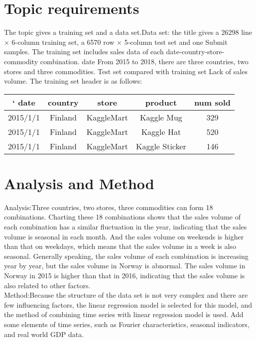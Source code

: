 \section{Topic requirements} \label{sec-preliminaries}

The topic gives a training set and a data set.Data set: the title gives a 26298 line × 6-column training set, a 6570 row × 5-column test set and one
Submit samples. The training set includes sales data of each date-country-store-commodity combination. date
From 2015 to 2018, there are three countries, two stores and three commodities. Test set compared with training set
Lack of sales volume. The training set header is as follows:
\\
\begin{tabular}{ c | c | c | c | c }
	\toprule`
	date    &  country    & store & product & num sold      \\
	\midrule
	2015/1/1 &  Finland   &  KaggleMart   & Kaggle Mug & 329   \\
	
	2015/1/1 &  Finland   &  KaggleMart   & Kaggle Hat & 520   \\
	
	2015/1/1 &  Finland   &  KaggleMart   & Kaggle Sticker & 146   \\
	\bottomrule
\end{tabular}




\section{Analysis and Method} \label{sec-method}

Analysis:Three countries, two stores, three commodities can form 18 combinations. Charting these 18 combinations shows that the sales volume of each combination has a similar fluctuation in the year, indicating that the sales volume is seasonal in each month. And the sales volume on weekends is higher than that on weekdays, which means that the sales volume in a week is also seasonal. Generally speaking, the sales volume of each combination is increasing year by year, but the sales volume in Norway is abnormal. The sales volume in Norway in 2015 is higher than that in 2016, indicating that the sales volume is also related to other factors.
\\
Method:Because the structure of the data set is not very complex and there are few
influencing factors, the linear regression model is selected for this model, and
the method of combining time series with linear regression model is used.
Add some elements of time series, such as Fourier characteristics, seasonal
indicators, and real world GDP data.

